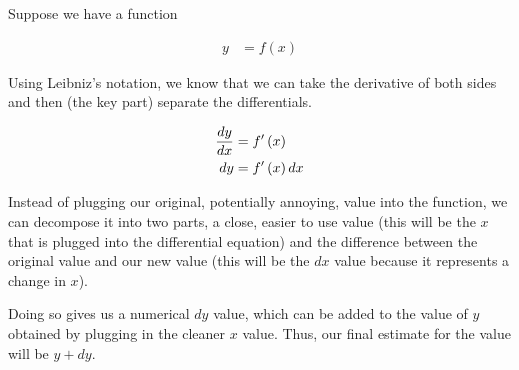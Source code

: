 Suppose we have a function

\begin{align*}
    y &= f \left( x \right)
\end{align*}

Using Leibniz's notation, we know that we can take the derivative of both sides and then (the key part) separate the differentials.

\begin{align*}
    \dfrac{dy}{dx} &= f^\prime \left( x \right) \\
    dy &= f^\prime \left( x \right) dx
\end{align*}

Instead of plugging our original, potentially annoying, value into the function, we can decompose it into two parts, a close, easier to use value (this will be the \( x \) that is plugged into the differential equation) and the difference between the original value and our new value (this will be the \( dx \) value because it represents a change in \( x \)).

Doing so gives us a numerical \( dy \) value, which can be added to the value of \( y \) obtained by plugging in the cleaner \( x \) value. Thus, our final estimate for the value will be \( y + dy \).

